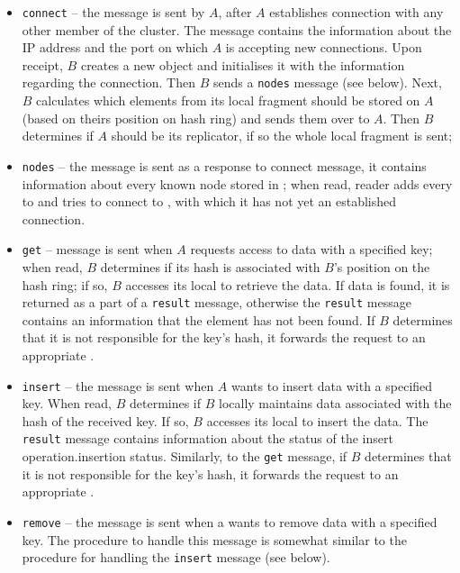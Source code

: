         \begin{itemize}
            \item \texttt{connect} -- the message is sent by \Node $A$, after $A$ establishes connection with any other member of the cluster. The message contains the information about the IP address and the port on which $A$ is accepting new connections. Upon receipt, \Node $B$ creates a new \KnownNode object and initialises it with the information regarding the connection. Then $B$ sends a \texttt{nodes} message (see below). Next, $B$ calculates which elements from its local \PHT fragment should be stored on $A$ (based on theirs position on hash ring) and sends them over to $A$. Then $B$ determines if $A$ should be its replicator, if so the whole local \PHT fragment is sent;
            \item \texttt{nodes} -- the message is sent as a response to connect message, it contains information about every known node stored in \NodesMap; when read, reader adds every \Node to \NodesMap and tries to connect to \Nodes, with which it has not yet an established connection.
            \item \texttt{get} -- message is sent when \Node $A$ requests access to data with a specified key; when read, \Node $B$ determines if its hash is associated with $B$'s position on the hash ring; if so, $B$ accesses its local \PHT to retrieve the data. If data is found, it is returned as a part of a \texttt{result} message, otherwise the \texttt{result} message contains an information that the element has not been found. If $B$ determines that it is not responsible for the key's hash, it forwards the request to an appropriate \Node.
            \item \texttt{insert} -- the message is sent when \Node $A$ wants to insert data with a specified key. When read, \Node $B$ determines if $B$ locally maintains data associated with the hash of the received key. If so, $B$ accesses its local \PHT to insert the data. The \texttt{result} message contains information about the status of the insert operation.insertion status. Similarly, to the \texttt{get} message, if $B$ determines that it is not responsible for the key's hash, it forwards the request to an appropriate \Node.
            \item \texttt{remove} -- the message is sent when a \Node wants to remove data with a specified key.
            The procedure to handle this message is somewhat similar to the procedure for handling the \texttt{insert} message (see below). 
        \end{itemize}
        

